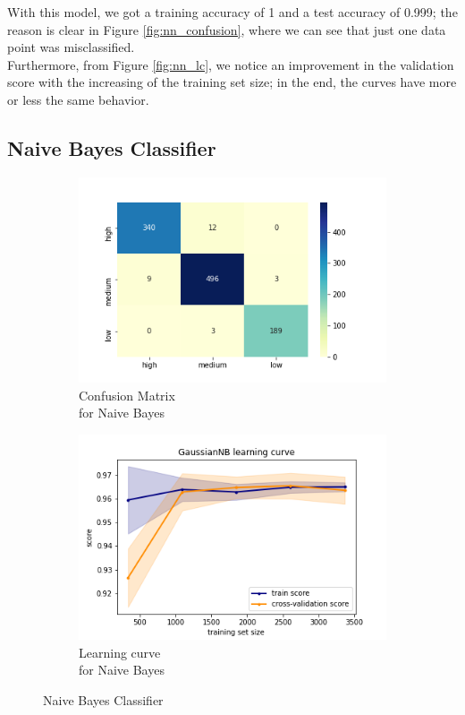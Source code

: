 With this model, we got a training accuracy of 1 and a test accuracy of 0.999; the reason is clear in Figure \ref{fig:nn_confusion}, where we can see that just one data point was misclassified.\\
Furthermore, from Figure \ref{fig:nn_lc}, we notice an improvement in the validation score with the increasing of the training set size; in the end, the curves have more or less the same behavior.

\subsection{Naive Bayes Classifier}
\begin{figure}[h!]
     \captionsetup{justification=centering}             
     \centering
     \begin{subfigure}{0.49\textwidth}
         \centering
         \captionsetup{type=figure}
         \includegraphics[scale=0.45]{img/classification/nb_confusion.png}
         \caption{Confusion Matrix \\ for Naive Bayes}
         \label{fig:nb_confusion}
     \end{subfigure}
     \begin{subfigure}{0.49\textwidth}
         \centering
         \includegraphics[scale=0.45]{img/classification/nb_lc.png}
         \caption{Learning curve \\ for Naive Bayes}
         \label{fig:nb_lc}
     \end{subfigure}
     \caption{Naive Bayes Classifier}
    \label{fig:nb}
\end{figure}
